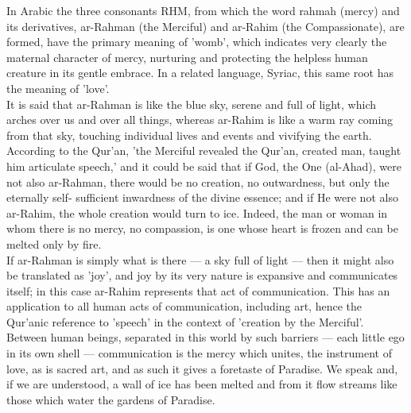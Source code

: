 \documentclass[10pt, twoside,openright]{book}
\begin{document}
In Arabic the three consonants RHM, from which the word rahmah (mercy) and its derivatives, ar\hyp{}Rahman 
(the Merciful) and ar\hyp{}Rahim (the Compassionate), are formed, have the primary meaning of 'womb', 
which indicates very clearly the maternal character of mercy, nurturing and protecting the helpless 
human creature in its gentle embrace. In a related language, Syriac, this same root has the meaning 
of 'love'. \\

It is said that ar\hyp{}Rahman is like the blue sky, serene and full of light, which arches over us and 
over all things, whereas ar\hyp{}Rahim is like a warm ray coming from that sky, touching individual lives 
and events and vivifying the earth. According to the Qur'an, 'the Merciful revealed the Qur'an, 
created man, taught him articulate speech,' and it could be said that if God, the One (al\hyp{}Ahad), were 
not also ar\hyp{}Rahman, there would be no creation, no outwardness, but only the eternally self\hyp{}
sufficient inwardness of the divine essence; and if He were not also ar\hyp{}Rahim, the whole creation 
would turn to ice. Indeed, the man or woman in whom there is no mercy, no compassion, is one whose 
heart is frozen and can be melted only by fire. \\

If ar-Rahman is simply what is there --- a sky full of light --- then it might also be translated as 
'joy', and joy by its very nature is expansive and communicates itself; in this case ar\hyp{}Rahim 
represents that act of communication. This has an application to all human acts of communication, 
including art, hence the Qur'anic reference to 'speech' in the context of 'creation by the Merciful'. 
Between human beings, separated in this world by such barriers --- each little ego in its own shell --- 
communication is the mercy which unites, the instrument of love, as is sacred art, and as such it 
gives a foretaste of Paradise. We speak and, if we are understood, a wall of ice has been melted and 
from it flow streams like those which water the gardens of Paradise. \\
\end{document}
